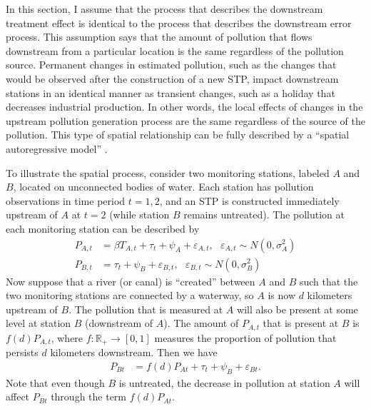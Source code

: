 \documentclass[12pt]{article}
\newcommand{\R}{\mathbb{R}}
\newcommand{\e}{\varepsilon}
\newcommand{\anum}[1]{\begin{align}#1\end{align}}
\begin{document}
In this section, I assume that the process that describes the downstream treatment effect is identical to the process that describes the downstream error process. This assumption says that the amount of pollution that flows downstream from a particular location is the same regardless of the pollution source. Permanent  changes in estimated pollution, such as the changes that would be observed after the construction of a new STP, impact downstream stations in an identical manner as transient changes, such as a holiday that decreases industrial production. In other words, the local effects of changes in the upstream pollution generation process are the same regardless of the source of the pollution. This type of spatial relationship can be fully described by a ``spatial autoregressive model'' \citep{anselin1988, lesage2009}.

To illustrate the spatial process, consider two monitoring stations, labeled $A$ and $B$, located on unconnected bodies of water. Each station has pollution observations in time period $t=1,2$, and an STP is constructed immediately upstream of $A$ at $t=2$ (while station $B$ remains untreated). The pollution at each monitoring station can be described by
\anum{
	P_{A,t} &= \beta T_{A,t} + \tau_t + \psi_A + \e_{A,t},~~~ \e_{A,t} \sim N(0, \sigma^2_A) \\
	P_{B,t} &= \tau_t + \psi_B + \e_{B,t},~~~ \e_{B,t} \sim N(0, \sigma^2_B)	
}
Now suppose that a river (or canal) is ``created'' between $A$ and $B$ such that the two monitoring stations are connected by a waterway, so $A$ is now $d$ kilometers upstream of $B$. The pollution that is measured at $A$ will also be present at some level at station $B$ (downstream of $A$). The amount of $P_{A,t}$ that is present at $B$ is $f(d)P_{A,t}$, where $f:\R_+ \rightarrow [0,1]$ measures the proportion of pollution that persists $d$ kilometers downstream. Then we have
\anum{
	P_{Bt} &= f(d)P_{At} + \tau_t + \psi_B + \e_{Bt}.
}
Note that even though $B$ is untreated, the decrease in pollution at station $A$ will affect $P_{Bt}$ through the term $f(d)P_{At}$. 
\end{document}
